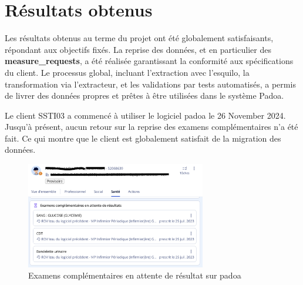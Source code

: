 \section{Résultats obtenus}
Les résultats obtenus au terme du projet ont été globalement satisfaisants, répondant aux objectifs fixés. La reprise des données, et en particulier des \textbf{measure\_requests}, a été réalisée garantissant la conformité aux spécifications du client.
Le processus global, incluant l’extraction avec l’esquilo, la transformation via l’extracteur, et les validations par tests automatisés, a permis de livrer des données propres et prêtes à être utilisées dans le système Padoa. 

Le client SSTI03 a commencé à utiliser le logiciel padoa le 26 November 2024. Jusqu'à présent, aucun retour sur la reprise des examens complémentaires n'a été fait. Ce qui montre que le client est globalement satisfait de la migration des données. 

\begin{figure}[h!]
    \centering
    \includegraphics[width=0.7\textwidth]{4_attachments/figures/padoa_exam.png} %
    \caption{Examens complémentaires en attente de résultat sur padoa}
    \label{fig:upside_down}
\end{figure}

